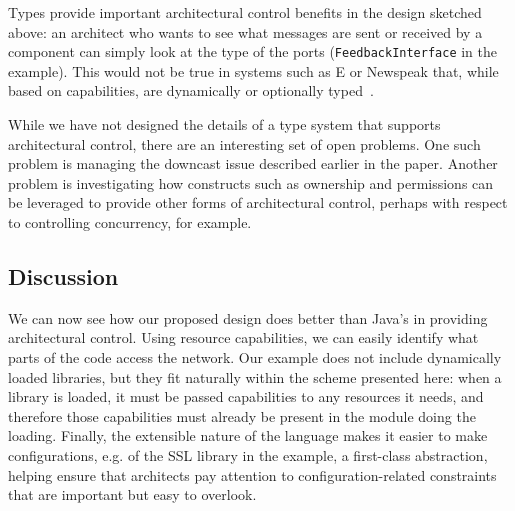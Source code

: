 \documentclass[runningheads]{llncs}
\begin{document}
\begin{sloppypar}
Types provide important architectural control benefits in the design sketched above: an architect who wants to see what messages are sent or received by a component can simply look at the type of the ports (\texttt{FeedbackInterface} in the example).  This would not be true in systems such as E or Newspeak that, while based on capabilities, are dynamically or optionally typed~\cite{MarkMiller-E,BrachaNewspeakModules}.

While we have not designed the details of a type system that supports architectural control, there are an interesting set of open problems.  One such problem is managing the downcast issue described earlier in the paper.  Another problem is investigating how constructs such as ownership and permissions can be leveraged to provide other forms of architectural control, perhaps with respect to controlling concurrency, for example.


\subsection{Discussion}  

We can now see how our proposed design does better than Java's in providing architectural control.  Using resource capabilities, we can easily identify what parts of the code access the network.  Our example does not include dynamically loaded libraries, but they fit naturally within the scheme presented here: when a library is loaded, it must be passed capabilities to any resources it needs, and therefore those capabilities must already be present in the module doing the loading.  Finally, the extensible nature of the language makes it easier to make configurations, e.g. of the SSL library in the example, a first-class abstraction, helping ensure that architects pay attention to configuration-related constraints that are important but easy to overlook.













\end{sloppypar}
\end{document}
